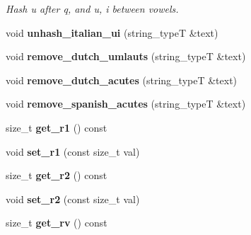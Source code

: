 \begin{DoxyCompactItemize}
\begin{DoxyCompactList}\small\item\em Hash u after q, and u, i between vowels. \end{DoxyCompactList}\item 
\hypertarget{classstemming_1_1stem_ab4f2f7360665b96d941ba614dc3d5092}{void {\bfseries unhash\+\_\+italian\+\_\+ui} (string\+\_\+type\+T \&text)}\label{classstemming_1_1stem_ab4f2f7360665b96d941ba614dc3d5092}

\item 
\hypertarget{classstemming_1_1stem_a44d995c39f2a31089ae3505fb483cbfa}{void {\bfseries remove\+\_\+dutch\+\_\+umlauts} (string\+\_\+type\+T \&text)}\label{classstemming_1_1stem_a44d995c39f2a31089ae3505fb483cbfa}

\item 
\hypertarget{classstemming_1_1stem_a42ba7697636adbf2d757c360a981920f}{void {\bfseries remove\+\_\+dutch\+\_\+acutes} (string\+\_\+type\+T \&text)}\label{classstemming_1_1stem_a42ba7697636adbf2d757c360a981920f}

\item 
\hypertarget{classstemming_1_1stem_a0b3535733088736897f35f8d925c92e9}{void {\bfseries remove\+\_\+spanish\+\_\+acutes} (string\+\_\+type\+T \&text)}\label{classstemming_1_1stem_a0b3535733088736897f35f8d925c92e9}

\item 
\hypertarget{classstemming_1_1stem_a09ab497dfe31fc007c70d7f7d790fa51}{size\+\_\+t {\bfseries get\+\_\+r1} () const }\label{classstemming_1_1stem_a09ab497dfe31fc007c70d7f7d790fa51}

\item 
\hypertarget{classstemming_1_1stem_a87fa173343063b5e85722edefe493ab5}{void {\bfseries set\+\_\+r1} (const size\+\_\+t val)}\label{classstemming_1_1stem_a87fa173343063b5e85722edefe493ab5}

\item 
\hypertarget{classstemming_1_1stem_a90aba2c99e1fa12883eba32211089f3b}{size\+\_\+t {\bfseries get\+\_\+r2} () const }\label{classstemming_1_1stem_a90aba2c99e1fa12883eba32211089f3b}

\item 
\hypertarget{classstemming_1_1stem_a032bb774988c5b8f6fae7cf28b59d485}{void {\bfseries set\+\_\+r2} (const size\+\_\+t val)}\label{classstemming_1_1stem_a032bb774988c5b8f6fae7cf28b59d485}

\item 
\hypertarget{classstemming_1_1stem_aefa75f006e0b4b623a2608dc23dff605}{size\+\_\+t {\bfseries get\+\_\+rv} () const }\label{classstemming_1_1stem_aefa75f006e0b4b623a2608dc23dff605}


\end{DoxyCompactItemize}
